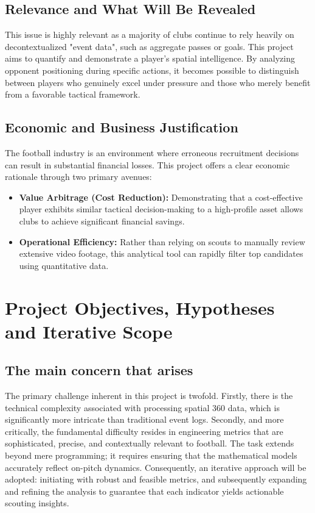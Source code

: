 \documentclass[12pt,a4paper]{article}
\begin{document}
\subsection{Relevance and What Will Be Revealed}
This issue is highly relevant as a majority of clubs continue to rely heavily on decontextualized "event data", such as aggregate passes or goals. This project aims to quantify and demonstrate a player's spatial intelligence. By analyzing opponent positioning during specific actions, it becomes possible to distinguish between players who genuinely excel under pressure and those who merely benefit from a favorable tactical framework.

\subsection{Economic and Business Justification}
The football industry is an environment where erroneous recruitment decisions can result in substantial financial losses. This project offers a clear economic rationale through two primary avenues:
\begin{itemize}
    \item \textbf{Value Arbitrage (Cost Reduction):} Demonstrating that a cost-effective player exhibits similar tactical decision-making to a high-profile asset allows clubs to achieve significant financial savings.
    \item \textbf{Operational Efficiency:} Rather than relying on scouts to manually review extensive video footage, this analytical tool can rapidly filter top candidates using quantitative data.
\end{itemize}

\section{Project Objectives, Hypotheses and Iterative Scope}

\subsection{The main concern that arises}
The primary challenge inherent in this project is twofold. Firstly, there is the technical complexity associated with processing spatial 360 data, which is significantly more intricate than traditional event logs. Secondly, and more critically, the fundamental difficulty resides in engineering metrics that are sophisticated, precise, and contextually relevant to football. The task extends beyond mere programming; it requires ensuring that the mathematical models accurately reflect on-pitch dynamics. Consequently, an iterative approach will be adopted: initiating with robust and feasible metrics, and subsequently expanding and refining the analysis to guarantee that each indicator yields actionable scouting insights.
\end{document}
